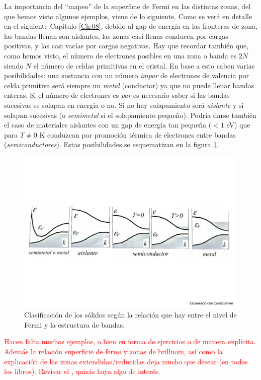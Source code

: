 La importancia del ``mapeo'' de la superficie de Fermi en las distintas zonas, del que hemos visto algunos ejemplos, viene de lo siguiente. Como se verá en detalle en el siguiente Capítulo \ref{Ch:08}, debido al gap de energía en las fronteras de zona, las bandas llenan son aislantes, las zonas casi llenas conducen por cargas positivas, y las casi vacías por cargas negativas. Hay que recordar también que, como hemos visto, el número de electrones posibles en una zona o banda es $2N$ siendo $N$ el número de celdas primitivas en el cristal. En base a esto caben varias posibilidades: una sustancia con un número \textit{impar} de electrones de valencia por celda primitiva será siempre un \textit{metal} (conductor) ya que no puede llenar bandas enteras. Si el número de electrones es \textit{par} es necesario saber si las bandas sucesivas se solapan en energía o no. Si no hay solapamiento será \textit{aislante} y si solapan sucesivas (o \textit{semimetal} si el solapamiento pequeño). Podría darse también el caso de materiales aislantes con un gap de energía tan pequeña ($<1$ eV) que para $T\neq 0$ K conduzcan por promoción térmica de electrones entre bandas (\textit{semiconductores}). Estas posibilidades se esquematizan en la figura \ref{Fig:07-10}.

\begin{figure}[h!] \centering
	\includegraphics[scale=0.5]{Cuerpo/Ch_07/Fotos libro 10.pdf}
	\caption{Clasificación de los sólidos según la relación que hay entre el nivel de Fermi y la estructura de bandas.}
	\label{Fig:07-10}
\end{figure}    


\begin{Anotacion}
	\textcolor{red}{Hacen falta muchos ejemplos, o bien en forma de ejercicios o de manera explícita. Además la relación superficie de fermi y zonas de brilluoin, así como la explicación de las zonas extendidas/reducidas deja mucho que desear (en todos los libros). Revisar el \cite{Quiin}, quizás haya algo de interés.}
\end{Anotacion}



